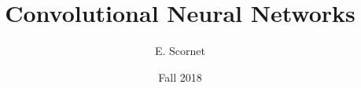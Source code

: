 

\usepackage{pdfpages}
\usepackage{tikz}
\usepackage{dsfont}

\usepackage[style=alphabetic, citestyle = authoryear, maxcitenames=2,backend=biber]{biblatex}


\newcommand\citem[1]{{\scriptsize[\citetitle{#1}, \cite{#1}]}}

\newcommand\redd[1]{\textcolor{red}{#1}}
\newcommand\blue[1]{\textcolor{blue}{#1}}
\newcommand\iid{\textit{i.i.d.}}
\newcommand\R{\mathds{R}}
\newcommand\bx{\mathbf{x}}
\renewcommand\pen{\textrm{pen}}
\newcommand{\E}{\mathds{E}}
\newcommand{\V}{\mathds{V}}
\newcommand{\cov}{\mathds{C}}
\renewcommand{\P}{\mathds{P}}

\usepackage{ifthen}
\newcommand{\ifinclude}[1]{\ifthenelse{\boolean{correction_bool}}{#1}{}}

\usepackage{graphicx}
\graphicspath{{../}}
\usepackage{ragged2e}




\title[Deep Learning]{Convolutional Neural Networks\\
\small
}

\author{E. Scornet}

\date{Fall 2018}



\begin{frame}
  \titlepage
\end{frame}




